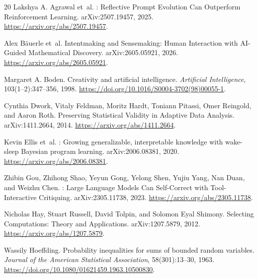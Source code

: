 \documentclass[11pt,letterpaper]{article}
\theoremstyle{remark}\newtheorem{remark}{Remark}[section]
\begin{document}
\clearpage
\begingroup
\small
{}
\setlength{\bibsep}{0.5em}
\begin{thebibliography}{20}
Lakshya A. Agrawal et~al.
: Reflective Prompt Evolution Can Outperform Reinforcement Learning.
\newblock arXiv:2507.19457, 2025.
\newblock \url{https://arxiv.org/abs/2507.19457}.

Alex B{\"a}uerle et~al.
\newblock Intentmaking and Sensemaking: Human Interaction with {AI}-Guided Mathematical Discovery.
\newblock arXiv:2605.05921, 2026.
\newblock \url{https://arxiv.org/abs/2605.05921}.

Margaret A. Boden.
\newblock Creativity and artificial intelligence.
\newblock \emph{Artificial Intelligence}, 103(1--2):347--356, 1998.
\newblock \url{https://doi.org/10.1016/S0004-3702(98)00055-1}.

Cynthia Dwork, Vitaly Feldman, Moritz Hardt, Toniann Pitassi, Omer Reingold, and Aaron Roth.
\newblock Preserving Statistical Validity in Adaptive Data Analysis.
\newblock arXiv:1411.2664, 2014.
\newblock \url{https://arxiv.org/abs/1411.2664}.

Kevin Ellis et~al.
: Growing generalizable, interpretable knowledge with wake-sleep {Bayesian} program learning.
\newblock arXiv:2006.08381, 2020.
\newblock \url{https://arxiv.org/abs/2006.08381}.

Zhibin Gou, Zhihong Shao, Yeyun Gong, Yelong Shen, Yujiu Yang, Nan Duan, and Weizhu Chen.
: Large Language Models Can Self-Correct with Tool-Interactive Critiquing.
\newblock arXiv:2305.11738, 2023.
\newblock \url{https://arxiv.org/abs/2305.11738}.

Nicholas Hay, Stuart Russell, David Tolpin, and Solomon Eyal Shimony.
\newblock Selecting Computations: Theory and Applications.
\newblock arXiv:1207.5879, 2012.
\newblock \url{https://arxiv.org/abs/1207.5879}.

Wassily Hoeffding.
\newblock Probability inequalities for sums of bounded random variables.
\newblock \emph{Journal of the American Statistical Association}, 58(301):13--30, 1963.
\newblock \url{https://doi.org/10.1080/01621459.1963.10500830}.


\end{thebibliography}
\end{document}
